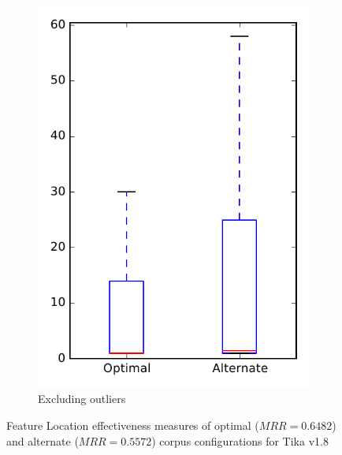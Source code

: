 \begin{figure}
\begin{subfigure}{.4\textwidth}
        \includegraphics[height=0.4\textheight]{figures/combo/flt_rq2_tika_no_outlier}
        \caption{Excluding outliers}\label{fig:combo:flt:rq2:tika_no_outlier}
    \end{subfigure}
\caption[Feature Location effectiveness measures of optimal and alternate corpus configurations for Tika v1.8]%
{Feature Location effectiveness measures of optimal ($MRR=0.6482$) and alternate ($MRR=0.5572$) corpus configurations for Tika v1.8}
\label{fig:combo:flt:rq2:tika}
\end{figure}
